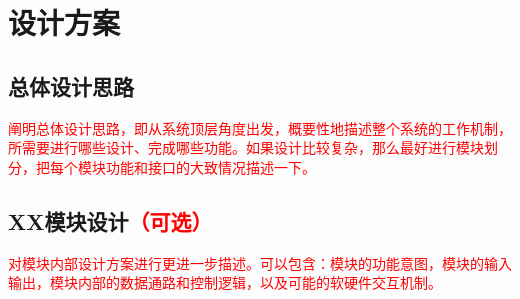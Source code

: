 \section{设计方案}
\subsection{总体设计思路}
\textcolor{red}{阐明总体设计思路，即从系统顶层角度出发，概要性地描述整个系统的工作机制，所需要进行哪些设计、完成哪些功能。如果设计比较复杂，那么最好进行模块划分，把每个模块功能和接口的大致情况描述一下。}
\subsection{XX模块设计\textcolor{red}{（可选）}}

\textcolor{red}{对模块内部设计方案进行更进一步描述。可以包含：模块的功能意图，模块的输入输出，模块内部的数据通路和控制逻辑，以及可能的软硬件交互机制。}